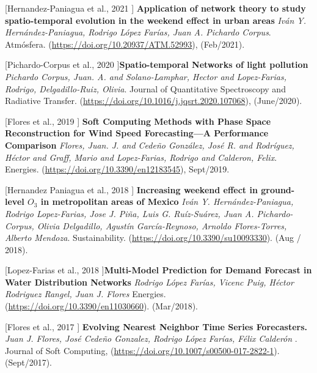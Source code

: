 \documentclass[7pt]{article}
\newenvironment{innerlist}[1][\enskip\textbullet]%
        {\begin{compactitem}[#1]}{\end{compactitem}}
\newcommand{\blankline}{\quad\pagebreak[2]}
\begin{document}
\blankline




\begin{innerlist}
\item [[Hernandez-Paniagua et al., 2021]] \textbf{Application of network theory to study spatio-temporal evolution in
the weekend effect in urban areas} \textit{Iván Y. Hernández-Paniagua, Rodrigo López Farías, Juan A. Pichardo Corpus}. Atmósfera. (\url{https://doi.org/10.20937/ATM.52993}), (Feb/2021).

\item [[Pichardo-Corpus et al., 2020]]\textbf{Spatio-temporal Networks of light pollution} \textit{{Pichardo Corpus, Juan. A. and Solano-Lamphar, Hector and Lopez-Farias, Rodrigo, Delgadillo-Ruiz, Olivia}}. {Journal of Quantitative Spectroscopy and Radiative Transfer}. (\url{https://doi.org/10.1016/j.jqsrt.2020.107068}), ({June/2020}).

\item [[Flores et al., 2019]] \textbf{Soft Computing Methods with Phase Space Reconstruction for Wind Speed Forecasting—A Performance Comparison} \textit{{Flores, Juan. J. and Cedeño González, José R. and Rodríguez, Héctor and Graff, Mario and Lopez-Farias, Rodrigo and Calderon, Felix}}. {Energies}. (\url{https://doi.org/10.3390/en12183545}), {Sept/2019}.

\item [[Hernandez Paniagua et al., 2018]] \textbf{Increasing weekend effect in ground-level $O_3$ in metropolitan areas of Mexico} \textit{Iván Y. Hernández-Paniagua, Rodrigo Lopez-Farias, Jose J. Piña, Luis G. Ruíz-Suárez, Juan A. Pichardo-Corpus, Olivia Delgadillo, Agustín García-Reynoso, Arnoldo Flores-Torres, Alberto Mendoza}. {Sustainability}. (\url{https://doi.org/10.3390/su10093330}). (Aug / 2018).

\item [[Lopez-Farias et al., 2018]]\textbf{Multi-Model Prediction for Demand Forecast in
Water Distribution Networks} \textit{Rodrigo López Farías, Vicenc Puig, Héctor Rodriguez Rangel, Juan J. Flores} {Energies}. (\url{https://doi.org/10.3390/en11030660}). ({Mar/2018}).

\item  [[Flores et al., 2017]] \textbf{Evolving Nearest Neighbor Time Series Forecasters.} \textit{Juan J. Flores, José Cede\~no Gonzalez, Rodrigo López Farías, Félix Calderón }.  {Journal of Soft Computing},
(\url{https://doi.org/10.1007/s00500-017-2822-1}). (Sept/2017).


\end{innerlist}
\end{document}
